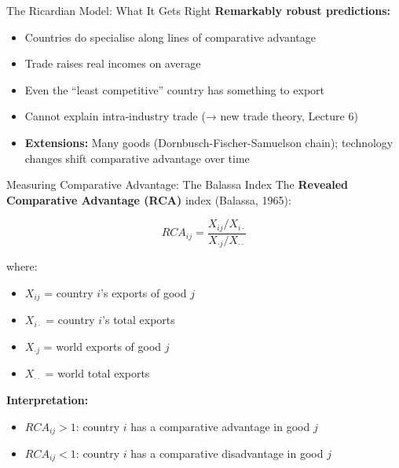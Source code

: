 \documentclass[
  ignorenonframetext,
  aspectratio=169,
]{beamer}
\makeatletter
\providecommand{\tightlist}{%
  \setlength{\itemsep}{0pt}\setlength{\parskip}{0pt}}
\let\quarto@originallabel\label
\DeclareRobustCommand*{\label}[1]{\quarto@originallabel{#1}}
\makeatother
\begin{document}
\begin{frame}{The Ricardian Model: What It Gets Right}
\label{the-ricardian-model-what-it-gets-right}
\textbf{Remarkably robust predictions:}

\begin{itemize}
\tightlist
\item
  Countries do specialise along lines of comparative advantage
\item
  Trade raises real incomes on average
\item
  Even the ``least competitive'' country has something to export
\item
  Cannot explain intra-industry trade (→ new trade theory, Lecture 6)
\item
  \textbf{Extensions:} Many goods (Dornbusch-Fischer-Samuelson chain);
  technology changes shift comparative advantage over time
\end{itemize}

\end{frame}

\begin{frame}{Measuring Comparative Advantage: The Balassa Index}
\label{measuring-comparative-advantage-the-balassa-index}
The \textbf{Revealed Comparative Advantage (RCA)} index (Balassa, 1965):

\[RCA_{ij} = \frac{X_{ij} / X_{i \cdot}}{X_{\cdot j} / X_{\cdot \cdot}}\]

where:

\begin{itemize}
\tightlist
\item
  \(X_{ij}\) = country \(i\)'s exports of good \(j\)
\item
  \(X_{i\cdot}\) = country \(i\)'s total exports
\item
  \(X_{\cdot j}\) = world exports of good \(j\)
\item
  \(X_{\cdot\cdot}\) = world total exports
\end{itemize}

\textbf{Interpretation:}

\begin{itemize}
\tightlist
\item
  \(RCA_{ij} > 1\): country \(i\) has a comparative advantage in good
  \(j\)
\item
  \(RCA_{ij} < 1\): country \(i\) has a comparative disadvantage in good
  \(j\)
\end{itemize}
\end{frame}
\end{document}
